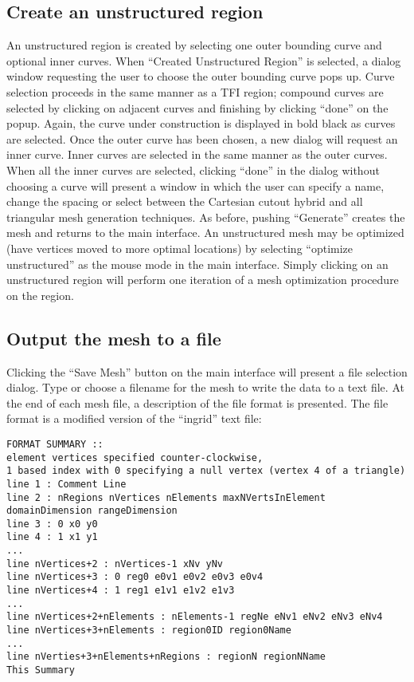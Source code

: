 \documentclass[letterpaper,12pt]{article}
\begin{document}
\subsection{Create an unstructured region}\label{sec:unst}
An unstructured region is created by selecting one outer bounding
curve and optional inner curves.  When ``Created Unstructured Region''
is selected, a dialog window requesting the user to choose the outer
bounding curve pops up.  Curve selection proceeds in the same manner
as a {TFI} region; compound curves are selected by clicking on
adjacent curves and finishing by clicking ``done'' on the popup.
Again, the curve under construction is displayed in bold black as
curves are selected.  Once the outer curve has been chosen, a new
dialog will request an inner curve.  Inner curves are selected in the
same manner as the outer curves.  When all the inner curves are
selected, clicking ``done'' in the dialog without choosing a curve
will present a window in which the user can specify a name, change the
spacing or select between the Cartesian cutout hybrid and all
triangular mesh generation techniques.  As before, pushing
``Generate'' creates the mesh and returns to the main interface.  An
unstructured mesh may be optimized (have vertices moved to more
optimal locations) by selecting ``optimize unstructured'' as the mouse
mode in the main interface.  Simply clicking on an unstructured region
will perform one iteration of a mesh optimization procedure on the
region.
\subsection{Output the mesh to a file}\label{sec:fileformat}
Clicking the ``Save Mesh'' button on the main interface will present a
file selection dialog.  Type or choose a filename for the mesh to
write the data to a text file.  At the end of each mesh file, a
description of the file format is presented.  The file format is a
modified version of the ``ingrid'' text file:
\begin{verbatim}
FORMAT SUMMARY ::
element vertices specified counter-clockwise, 
1 based index with 0 specifying a null vertex (vertex 4 of a triangle)
line 1 : Comment Line
line 2 : nRegions nVertices nElements maxNVertsInElement domainDimension rangeDimension
line 3 : 0 x0 y0
line 4 : 1 x1 y1
...
line nVertices+2 : nVertices-1 xNv yNv 
line nVertices+3 : 0 reg0 e0v1 e0v2 e0v3 e0v4
line nVertices+4 : 1 reg1 e1v1 e1v2 e1v3 
...
line nVertices+2+nElements : nElements-1 regNe eNv1 eNv2 eNv3 eNv4
line nVertices+3+nElements : region0ID region0Name
...
line nVerties+3+nElements+nRegions : regionN regionNName
This Summary
\end{verbatim}
\end{document}
